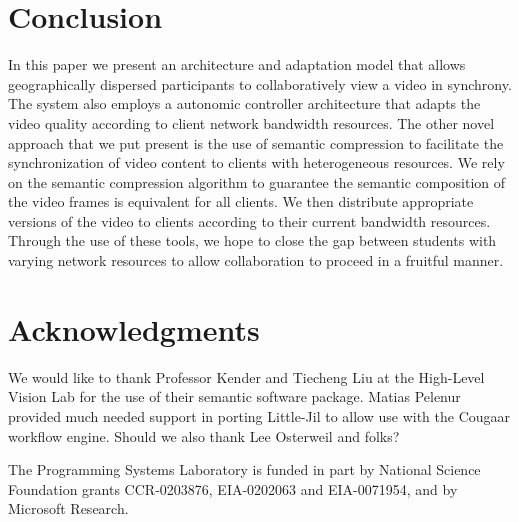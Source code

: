 \documentclass{sig-alternate}
\begin{document}
\section{Conclusion}

In this paper we present an architecture and adaptation model that
allows geographically dispersed participants to collaboratively view a
video in synchrony.  The system also employs a autonomic controller
architecture that adapts the video quality according to client network
bandwidth resources.  The other novel approach that we put present is
the use of semantic compression to facilitate the synchronization of
video content to clients with heterogeneous resources.  We rely on the
semantic compression algorithm to guarantee the semantic composition
of the video frames is equivalent for all clients.  We then distribute
appropriate versions of the video to clients according to their
current bandwidth resources.  Through the use of these tools, we hope
to close the gap between students with varying network resources to
allow collaboration to proceed in a fruitful manner.

\section{Acknowledgments}
We would like to thank Professor Kender and Tiecheng Liu at the
High-Level Vision Lab for the use of their semantic software package.
Matias Pelenur provided much needed support in porting Little-Jil to
allow use with the Cougaar workflow engine.  Should we also thank Lee
Osterweil and folks?

The Programming Systems Laboratory is funded in part by National
Science Foundation grants CCR-0203876, EIA-0202063 and EIA-0071954,
and by Microsoft Research.

 

% 
\end{document}
